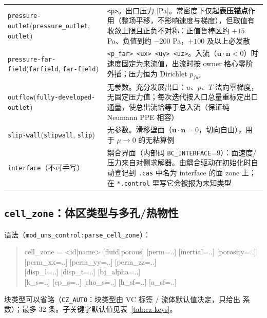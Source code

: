 {\begin{longtable}{@{}>{\raggedright\arraybackslash}p{}>{\raggedright\arraybackslash}p{}@{}}
\texttt{pressure-outlet}\newline (\texttt{pressure\_outlet}, \texttt{outlet}) & \texttt{<p>}。出口压力 [Pa]。常密度下仅起\textbf{表压锚点}作用（整场平移，不影响速度与梯度），但取值有收敛上限且正负不对称：正值鲁棒区约 $+15$ Pa、负值到约 $-200$ Pa，$+100$ 及以上必发散 \\
\texttt{pressure-far-field}\newline (\texttt{farfield}, \texttt{far-field}) & \texttt{<p\_far> <ux> <uy> <uz>}。入流（$\mathbf{u}\cdot\mathbf{n}<0$）时速度固定为来流值，出流时按 owner 格心零阶外插；压力恒为 Dirichlet $p_{far}$ \\
\texttt{outflow}\newline (\texttt{fully-developed-outlet}) & 无参数。充分发展出口：$u$、$p$、$T$ 法向零梯度，无固定压力值；每次迭代按入口总量重标定出口通量，使总出流恰等于总入流（保证纯 Neumann PPE 相容） \\
\texttt{slip-wall}\newline (\texttt{slipwall}, \texttt{slip}) & 无参数。滑移壁面（$\mathbf{u}\cdot\mathbf{n}=0$，切向自由），用于 $\mu\to0$ 的无粘算例 \\
\texttt{interface}（不可手写） & 耦合界面（内部码 \texttt{BC\_INTERFACE}=9）：面速度/压力来自对侧求解器。由耦合驱动在初始化时自动登记到 \texttt{.cas} 中名为 interface 的面 zone 上；在 \texttt{*.control} 里写它会被报为未知类型 \\
\end{longtable}
}

\subsection{\texttt{cell\_zone}：体区类型与多孔/热物性}\label{app:cz}

语法（\texttt{mod\_uns\_control:parse\_cell\_zone}）：

\begin{quote}\ttfamily\small
cell\_zone = <id|name> [fluid|porous] [perm=..] [inertial=..] [porosity=..] \\
\phantom{cell\_zone = }[perm\_xx=..] [perm\_yy=..] [perm\_zz=..] \\
\phantom{cell\_zone = }[disp\_l=..] [disp\_t=..] [bj\_alpha=..] \\
\phantom{cell\_zone = }[k\_s=..] [cp\_s=..] [rho\_s=..] [h\_sf=..] [a\_sf=..]
\end{quote}

块类型可以省略（\texttt{CZ\_AUTO}：块类型由 VC 标签 / 流体默认值决定，只给出
系数）；最多 32 条。子关键字默认值见表~\ref{tab:cz-keys}。

